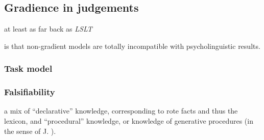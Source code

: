 \subsection{Gradience in judgements}

at least as far back as \emph{LSLT} \citep{LSLT}

is that non-gradient models are totally incompatible with psycholinguistic results.

\subsubsection{Task model}

\citet[][16]{Schutze1996}

\citet{Schutze2005}
\citet{Schutze2011}

\citet{Coleman1997}

\subsubsection{Falsifiability}

\citet{Armstrong1983}

\citet{Yang2008a}

a mix of ``declarative'' knowledge,
corresponding to rote facts and thus the lexicon,
and ``procedural'' knowledge, or knowledge of generative procedures 
(in the sense of J. \citealt{Anderson1993}). 

\citet{Logan1988}
\citet{Sfard1991}
\citet{Delazer2005}
